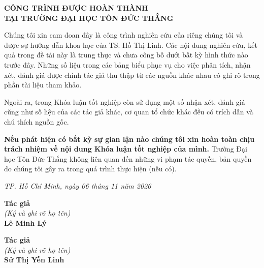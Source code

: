 \newpage
\begin{center}
{\fontsize{16pt}{24pt}\selectfont \textbf{CÔNG TRÌNH ĐƯỢC HOÀN THÀNH\\TẠI TRƯỜNG ĐẠI HỌC TÔN ĐỨC THẮNG}\par}
\end{center}
\vspace{0.5cm}

Chúng tôi xin cam đoan đây là công trình nghiên cứu của riêng chúng tôi và được sự hướng dẫn khoa học của TS. Hồ Thị Linh. Các nội dung nghiên cứu, kết quả trong đề tài này là trung thực và chưa công bố dưới bất kỳ hình thức nào trước đây. Những số liệu trong các bảng biểu phục vụ cho việc phân tích, nhận xét, đánh giá được chính tác giả thu thập từ các nguồn khác nhau có ghi rõ trong phần tài liệu tham khảo.

Ngoài ra, trong Khóa luận tốt nghiệp còn sử dụng một số nhận xét, đánh giá cũng như số liệu của các tác giả khác, cơ quan tổ chức khác đều có trích dẫn và chú thích nguồn gốc.

\textbf{Nếu phát hiện có bất kỳ sự gian lận nào chúng tôi xin hoàn toàn chịu trách nhiệm về nội dung Khóa luận tốt nghiệp của mình.} Trường Đại học Tôn Đức Thắng không liên quan đến những vi phạm tác quyền, bản quyền do chúng tôi gây ra trong quá trình thực hiện (nếu có).

\vspace{0.8cm}

\begin{flushright}
\textit{TP. Hồ Chí Minh, ngày 06 tháng 11 năm 2026}
\end{flushright}

\vspace{0.3cm}
\noindent
\begin{minipage}[t]{0.48\textwidth}
    \centering
    \textbf{Tác giả} \\
    \textit{(Ký và ghi rõ họ tên)} \\
    \vspace{2.5cm}
    \textbf{Lê Minh Lý}
\end{minipage}
\hfill
\begin{minipage}[t]{0.48\textwidth}
    \centering
    \textbf{Tác giả} \\
    \textit{(Ký và ghi rõ họ tên)} \\
    \vspace{2.5cm}
    \textbf{Sử Thị Yến Linh}
\end{minipage}
